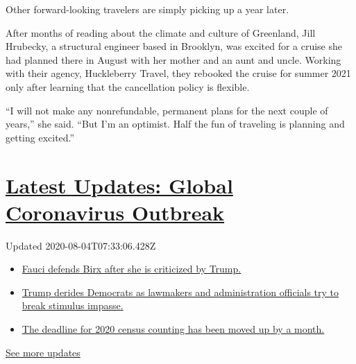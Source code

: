 Other forward-looking travelers are simply picking up a year later.

After months of reading about the climate and culture of Greenland, Jill
Hrubecky, a structural engineer based in Brooklyn, was excited for a
cruise she had planned there in August with her mother and an aunt and
uncle. Working with their agency, Huckleberry Travel, they rebooked the
cruise for summer 2021 only after learning that the cancellation policy
is flexible.

``I will not make any nonrefundable, permanent plans for the next couple
of years,'' she said. ``But I'm an optimist. Half the fun of traveling
is planning and getting excited.''

\hypertarget{latest-updates-global-coronavirus-outbreak}{%
\section{\texorpdfstring{\href{https://www.nytimes.com/2020/08/03/world/coronavirus-covid-19.html?action=click\&pgtype=Article\&state=default\&region=MAIN_CONTENT_1\&context=storylines_live_updates}{Latest
Updates: Global Coronavirus
Outbreak}}{Latest Updates: Global Coronavirus Outbreak}}\label{latest-updates-global-coronavirus-outbreak}}

Updated 2020-08-04T07:33:06.428Z

\begin{itemize}
\tightlist
\item
  \href{https://www.nytimes.com/2020/08/03/world/coronavirus-covid-19.html?action=click\&pgtype=Article\&state=default\&region=MAIN_CONTENT_1\&context=storylines_live_updates\#link-4547638f}{Fauci
  defends Birx after she is criticized by Trump.}
\item
  \href{https://www.nytimes.com/2020/08/03/world/coronavirus-covid-19.html?action=click\&pgtype=Article\&state=default\&region=MAIN_CONTENT_1\&context=storylines_live_updates\#link-15e7f995}{Trump
  derides Democrats as lawmakers and administration officials try to
  break stimulus impasse.}
\item
  \href{https://www.nytimes.com/2020/08/03/world/coronavirus-covid-19.html?action=click\&pgtype=Article\&state=default\&region=MAIN_CONTENT_1\&context=storylines_live_updates\#link-e5a2cda}{The
  deadline for 2020 census counting has been moved up by a month.}
\end{itemize}

\href{https://www.nytimes.com/2020/08/03/world/coronavirus-covid-19.html?action=click\&pgtype=Article\&state=default\&region=MAIN_CONTENT_1\&context=storylines_live_updates}{See
more updates}

